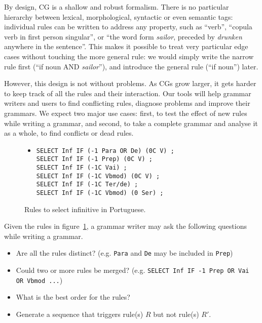 By design, CG is a shallow and robust formalism. 
There is no particular hierarchy between lexical, morphological,
syntactic or even semantic tags: individual rules can be written to address any
property, such as ``verb'', ``copula verb in first person singular'',
or ``the word form \emph{sailor}, preceded by \emph{drunken} anywhere in the
sentence''. This makes it possible to treat very particular edge
cases without touching the more general rule: we would simply write
the narrow rule first (``if noun AND \emph{sailor}''), and introduce
the general rule (``if noun'') later.


However, this design is not without problems. As CGs grow larger, it
gets harder to keep track of all the rules and their interaction.
Our tools will help grammar writers and users to find conflicting
rules, diagnose problems and improve their grammars. 
We expect two major use cases: 
first, to test the effect of new rules while writing a grammar, and
second, to take a complete grammar and analyse it as a whole, to find
conflicts or dead rules.



\begin{figure}[t]
\begin{center}

\begin{itemize}
\item[]
\begin{verbatim}SELECT Inf IF (-1 Para OR De) (0C V) ;
SELECT Inf IF (-1 Prep) (0C V) ;
SELECT Inf IF (-1C Vai) ;
SELECT Inf IF (-1C Vbmod) (0C V) ;
SELECT Inf IF (-1C Ter/de) ;
SELECT Inf IF (-1C Vbmod) (0 Ser) ;
\end{verbatim}
\end{itemize}

\caption{Rules to select infinitive in Portuguese.}
\end{center}

\label{infrules}
\end{figure}



Given the rules in figure~\ref{infrules}, a grammar writer may ask the following questions while writing a grammar. 

\begin{itemize}
\item Are all the rules distinct? (e.g. \texttt{Para} and \texttt{De} may be included in \texttt{Prep})
\item Could two or more rules be merged? (e.g. \texttt{SELECT Inf IF -1 Prep OR Vai OR Vbmod ...})
\item What is the best order for the rules?
\item Generate a sequence that triggers rule(s) $R$ but not rule(s) $R'$. 
\end{itemize}


